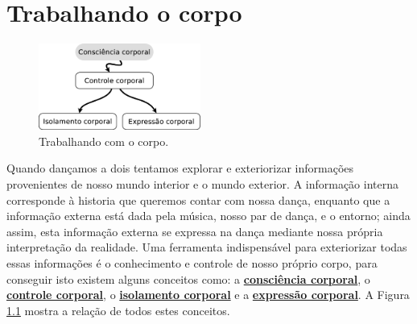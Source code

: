 

\chapter{Trabalhando o corpo}
\label{fig:bodyrelations}



\begin{figure}
\vspace{-10pt}
  \centering
    \includegraphics[width=0.475\textwidth]{chapters/cap-body/total.eps}
\caption{Trabalhando com o corpo.}
\vspace{-10pt}
\label{fig:bodycontroltotal}
\end{figure}
Quando dançamos a dois tentamos explorar e exteriorizar informações
provenientes de nosso mundo interior e o mundo exterior.
A informação interna corresponde à historia que queremos contar com nossa dança,
enquanto que a informação externa está dada pela música, nosso par de dança, e o entorno;
ainda assim, esta informação externa se expressa na dança 
mediante nossa própria interpretação da realidade.
Uma ferramenta indispensável para exteriorizar todas essas informações é o conhecimento e controle de
nosso próprio corpo, para conseguir isto existem alguns conceitos
como: 
a \hyperref[sec:BodyAwareness]{\textbf{consciência corporal}}, 
o \hyperref[sec:BodyControl]{\textbf{controle corporal}}, 
o \hyperref[sec:BodyIsolation]{\textbf{isolamento corporal}} e  
a \hyperref[sec:BodyExpression]{\textbf{expressão corporal}}.
A Figura \ref{fig:bodycontroltotal} mostra a relação de todos estes conceitos.



